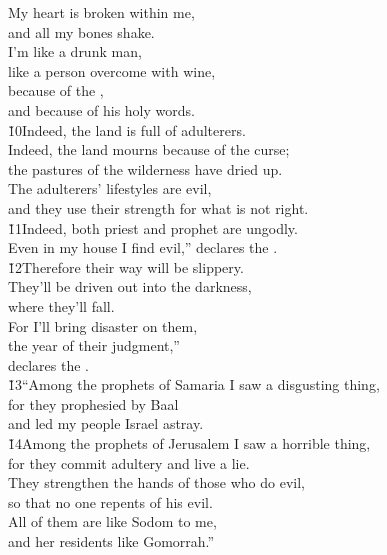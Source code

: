 \begin{poetry}
\poeml My heart is broken within me, \\
\poemll    and all my bones shake. \\
\poeml I'm like a drunk man, \\
\poemll    like a person overcome with wine, \\
\poeml because of the , \\
\poemll    and because of his holy words. \\
\poeml \v{10}Indeed, the land is full of adulterers. \\
\poemll    Indeed, the land mourns because of the curse; \\
\poemlll       the pastures of the wilderness have dried up. \\
\poeml The adulterers' lifestyles are evil, \\
\poemll    and they use their strength for what is not right. \\
\poeml \v{11}Indeed, both priest and prophet are ungodly. \\
\poemll    Even in my house I find evil,'' declares the . \\
\poeml \v{12}Therefore their way will be slippery. \\
\poemll    They'll be driven out into the darkness, \\
\poemlll       where they'll fall. \\
\poeml For I'll bring disaster on them, \\
\poemll    the year of their judgment,'' \\
\poemlll       declares the . \\
\poeml \v{13}``Among the prophets of Samaria I saw a disgusting thing, \\
\poemll    for they prophesied by Baal \\
\poemlll       and led my people Israel astray. \\
\poeml \v{14}Among the prophets of Jerusalem I saw a horrible thing, \\
\poemll    for they commit adultery and live a lie. \\
\poeml They strengthen the hands of those who do evil, \\
\poemll    so that no one repents of his evil. \\
\poeml All of them are like Sodom to me, \\
\poemll    and her residents like Gomorrah.''
\end{poetry}

